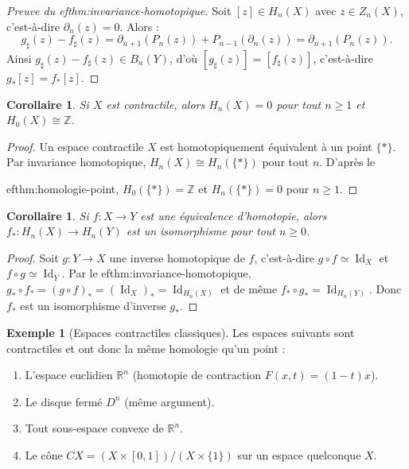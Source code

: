 \documentclass[12pt,a4paper,openany]{book}
\theoremstyle{definition}
\newtheorem{exemple}[definition]{Exemple}
\theoremstyle{plain}
\newtheorem{corollaire}[definition]{Corollaire}
\theoremstyle{remark}
\newcommand{\Z}{\mathbb{Z}}
\newcommand{\R}{\mathbb{R}}
\DeclareMathOperator{\Id}{Id}
\begin{document}
\begin{proof}[Preuve du 
ef{thm:invariance-homotopique}]
Soit $[z] \in H_n(X)$ avec $z \in Z_n(X)$, c'est-à-dire $\partial_n(z) = 0$. Alors :
\[
  g_\sharp(z) - f_\sharp(z) = \partial_{n+1}(P_n(z)) + P_{n-1}(\partial_n(z)) = \partial_{n+1}(P_n(z)).
\]
Ainsi $g_\sharp(z) - f_\sharp(z) \in B_n(Y)$, d'où $[g_\sharp(z)] = [f_\sharp(z)]$, c'est-à-dire $g_*[z] = f_*[z]$.
\end{proof}

\begin{corollaire}\label{cor:contractile-homologie}
Si $X$ est contractile, alors $H_n(X) = 0$ pour tout $n \geq 1$ et $H_0(X) \cong \Z$.
\end{corollaire}

\begin{proof}
Un espace contractile $X$ est homotopiquement équivalent à un point $\{*\}$.
Par invariance homotopique, $H_n(X) \cong H_n(\{*\})$ pour tout $n$. D'après le

ef{thm:homologie-point}, $H_0(\{*\}) = \Z$ et $H_n(\{*\}) = 0$ pour $n \geq 1$.
\end{proof}

\begin{corollaire}\label{cor:equivalence-homotopie-iso}
Si $f \colon X \to Y$ est une équivalence d'homotopie, alors $f_* \colon H_n(X) \to H_n(Y)$ est
un isomorphisme pour tout $n \geq 0$.
\end{corollaire}

\begin{proof}
Soit $g \colon Y \to X$ une inverse homotopique de $f$, c'est-à-dire $g \circ f \simeq \Id_X$
et $f \circ g \simeq \Id_Y$. Par le 
ef{thm:invariance-homotopique},
$g_* \circ f_* = (g \circ f)_* = (\Id_X)_* = \Id_{H_n(X)}$ et de même
$f_* \circ g_* = \Id_{H_n(Y)}$. Donc $f_*$ est un isomorphisme d'inverse $g_*$.
\end{proof}

\begin{exemple}[Espaces contractiles classiques]\label{ex:espaces-contractiles}
Les espaces suivants sont contractiles et ont donc la même homologie qu'un point :
\begin{enumerate}[label=(\roman*)]
  \item L'espace euclidien $\R^n$ (homotopie de contraction $F(x,t) = (1-t)x$).
  \item Le disque fermé $D^n$ (même argument).
  \item Tout sous-espace convexe de $\R^n$.
  \item Le cône $CX = (X \times [0,1])/(X \times \{1\})$ sur un espace quelconque $X$.
\end{enumerate}
\end{exemple}
\end{document}
